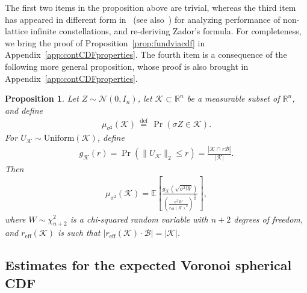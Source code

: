\documentclass[article,doublecolumn]{IEEEtran}
\newcommand{\EE}{{\mathbb{E}}}
\newcommand{\df}{{\, \stackrel{\mathrm{def}}{=}\, }}
\newcommand{\R}{{\mathbb{R}}}
\newcommand{\Unif}{\mathrm{Uniform}}
\newcommand{\KK}{{\mathcal{K}}}
\newcommand{\mBeuc}{{\mathcal{B}}}
\newcommand{\reff}{{r_{\mathrm{eff}}}}
\newtheorem{prop}[thm]{Proposition}
\begin{document}
The first two items in the proposition above are trivial, whereas the third item has appeared in different form in~\cite[eq. 75]{torquato2010reformulation} (see also~\cite[Section III]{allen2022performance}) for analyzing performance of non-lattice infinite constellations, and re-deriving Zador's formula. For completeness, we bring the proof of Proposition~\ref{prop:fundviacdf} in Appendix~\ref{app:contCDFproperties}. The fourth item is a consequence of the following more general proposition, whose proof is also brought in Appendix~\ref{app:contCDFproperties}.





\begin{prop}
 Let $Z\sim\mathcal{N}(0,I_n)$, let $\KK\subset \R^n$ be a measurable subset of $\R^n$, and define
\begin{align}
\mu_{\sigma^2}(\KK)\df \Pr(\sigma Z\in\KK).    
\end{align}
For $U_{\KK}\sim\Unif(\KK)$, define
\begin{align}
g_\KK(r)=\Pr(\|U_\KK\|_2\leq r)=\frac{|\KK\cap r \mBeuc|}{|\KK|}.    \label{eq:genCDF_LC}
\end{align}
 Then
 \begin{align}
\mu_{\sigma^2}(\KK)=\EE\left[ \frac{g_\KK\left(\sqrt{\sigma^2 W}\right)}{\left(\frac{\sigma^2 W}{\reff(\KK)^2} \right)^{\frac{n}{2}}} \right],
 \end{align}
 where $W\sim\chi^2_{n+2}$ is a chi-squared random variable with $n+2$ degrees of freedom, and $\reff(\KK)$ is such that $|\reff(\KK)\cdot \mBeuc|=|\KK|$. 
 \label{prop:gaussianmeasureasEE}
\end{prop}


\subsection{Estimates for the expected Voronoi spherical CDF}
\end{document}
